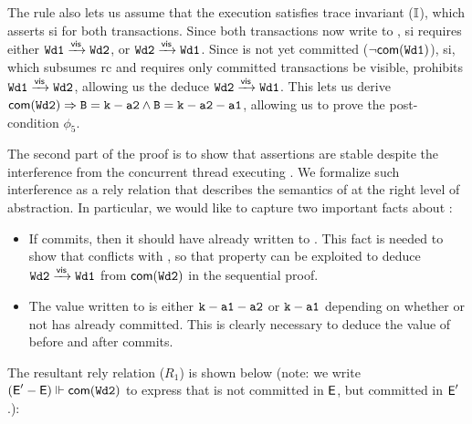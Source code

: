 \noindent The rule also lets us assume that the execution satisfies
trace invariant ($\mathbb{I}$), which asserts {\sc si} for both transactions.
Since both transactions now write to , {\sc si} requires either
${\tt Wd1} \xrightarrow{\textsf{vis}} {\tt Wd2}$, or ${\tt Wd2} \xrightarrow{\textsf{vis}} {\tt Wd1}$. Since 
is not yet committed ($\neg\textsf{com}({\tt Wd1})$), {\sc si}, which
subsumes {\sc rc} and requires only committed transactions be visible,
prohibits ${\tt Wd1} \xrightarrow{\textsf{vis}} {\tt Wd2}$, allowing us the deduce ${\tt Wd2}
\xrightarrow{\textsf{vis}} {\tt Wd1}$. This lets us derive ${\textsf{com}({\tt Wd2})}
\Rightarrow {\tt B = k-a2} \wedge {\tt B = k-a2-a1}$, allowing us to prove
the post-condition $\phi_5$.

The second part of the proof is to show that assertions are stable
despite the interference from the concurrent thread executing
. We formalize such interference as a rely relation that
describes the semantics of  at the right level of
abstraction. In particular, we would like to capture two important
facts about : 
\begin{itemize}
  \item  If  commits, then it should have already written to
  . This fact is needed to show that  conflicts with
  , so that  property can be exploited to deduce
  ${\tt Wd2} \xrightarrow{\textsf{vis}} {\tt Wd1}$ from $\textsf{com}({\tt Wd2})$ in the
  sequential proof.

  \item The value written to  is either ${\tt k-a1-a2}$ or
  ${\tt k-a1}$ depending on whether or not  has already
  committed. This is clearly necessary to deduce the value of 
  before and after  commits.
\end{itemize}
The resultant rely relation ($R_1$) is shown below (note: we
write $(\textsf{E}'-\textsf{E}) \Vdash {\textsf{com}({\tt Wd2})}$ to express that 
is not committed in $\textsf{E}$, but committed in $\textsf{E}'$.):
\vspace*{-1.5pt}
